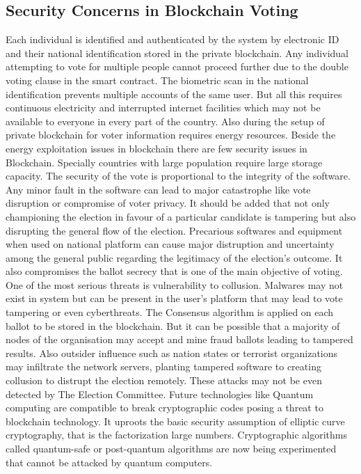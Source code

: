 \documentclass{report}
\begin{document}
\subsection{Security Concerns in Blockchain Voting}
Each individual is identiﬁed and authenticated by the system by electronic ID and their national identification stored in the private blockchain. Any individual attempting to vote for multiple people cannot proceed further due to the double voting clause in the smart contract. The biometric scan in the national identification prevents multiple accounts of the same user. 
But all this requires continuous electricity and interrupted internet facilities which may not be available to everyone in every part of the country.  Also during the setup of private blockchain for voter information requires energy resources.
Beside the energy exploitation issues in blockchain there are few security issues in Blockchain. Specially countries with large population require large storage capacity. The security of the vote is proportional to the integrity of the software. Any minor fault in the software can lead to major catastrophe like vote disruption or compromise of voter privacy. It should be added that not only championing the election in favour of a particular candidate is tampering but also disrupting the general flow of the election. Precarious softwares and equipment when used on national platform can cause major distruption and uncertainty among the general public regarding the legitimacy of the election's outcome. It also compromises the ballot secrecy that is one of the main objective of voting. One of the most serious threats is vulnerability to collusion. Malwares may not exist in system but can be present in the user's platform that may lead to vote tampering or even cyberthreats.
The Consensus algorithm is applied on each ballot to be stored in the blockchain. But it can be possible that a majority of nodes of the organisation may accept and mine fraud ballots leading to tampered results. Also outsider influence such as nation states or terrorist organizations may infiltrate the network servers, planting tampered software to creating collusion to distrupt the election remotely. These attacks may not be even detected by The Election Committee.
Future technologies like Quantum computing are compatible to break cryptographic codes posing a threat to blockchain technology. It uproots the basic security assumption of elliptic curve cryptography, that is the factorization large numbers. Cryptographic algorithms called quantum-safe or post-quantum algorithms are now being experimented that cannot be attacked by quantum computers. 
\end{document}
